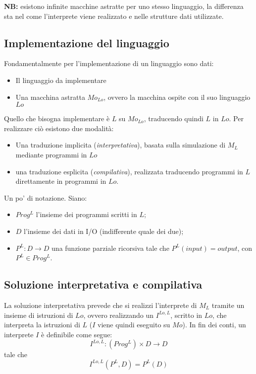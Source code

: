 \documentclass{article}[10pt]
\begin{document}
	\textbf{NB:} esistono infinite macchine astratte per uno stesso linguaggio, la differenza sta nel come l'interprete viene realizzato e nelle strutture dati utilizzate.
	
	\subsection{Implementazione del linguaggio}
	
	Fondamentalmente per l'implementazione di un linguaggio sono dati:
	\begin{itemize}
		\item Il linguaggio da implementare
		\item Una macchina astratta $Mo_{Lo}$, ovvero la macchina ospite con il suo linguaggio $Lo$
	\end{itemize}
	Quello che bisogna implementare è $L$ su $Mo_{Lo}$, traducendo quindi $L$ in $Lo$. Per realizzare ciò esistono due modalità:
	\begin{itemize}
		\item Una traduzione implicita (\textit{interpretativa}), basata sulla simulazione di $M_L$ mediante programmi in $Lo$
		\item una traduzione esplicita (\textit{compilativa}), realizzata traducendo programmi in $L$ direttamente in programmi in $Lo$.
	\end{itemize}

	Un po' di notazione. Siano:
	\begin{itemize}
		\item $Prog^L$ l'insieme dei programmi scritti in $L$;
		\item $D$ l'insieme dei dati in I/O (indifferente quale dei due);
		\item $P^L:D\to D$ una funzione parziale ricorsiva tale che $P^L(input)=output$, con $P^L\in Prog^L$.
	\end{itemize}
	
	\subsection{Soluzione interpretativa e compilativa}
	La soluzione interpretativa prevede che si realizzi l'interprete di $M_L$ tramite un insieme di istruzioni di $Lo$, ovvero realizzando un $I^{Lo,L}$, scritto in $Lo$, che interpreta la istruzioni di $L$ ($I$ viene quindi eseguito su $Mo$).
	In fin dei conti, un interprete $I$ è definibile come segue:
	$$I^{Lo,L}:(Prog^L) \times D\to D$$\quad tale che $$I^{Lo,L}(P^L, D)=P^L(D)$$
	
\end{document}
